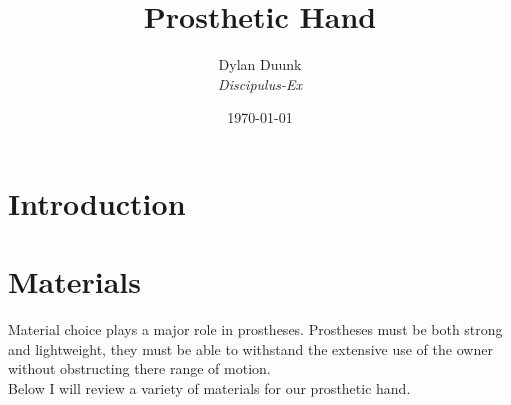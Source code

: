 \documentclass[11pt, a4paper]{article}
\title{\Huge{Prosthetic Hand} }
\author{Dylan Duunk \\ \textit{Discipulus-Ex} }
\date{\today}
\begin{document}
\begin{titlepage}
    \maketitle
\end{titlepage}




\newpage
\tableofcontents
\newpage
{}

\section{Introduction}
\lipsum[1]

\section{Materials} \label{materials}
Material choice plays a major role in prostheses.
Prostheses must be both strong and lightweight, they must be able to withstand the extensive use of the owner without obstructing there range of motion.
\\
Below I will review a variety of materials for our prosthetic hand.
\end{document}
